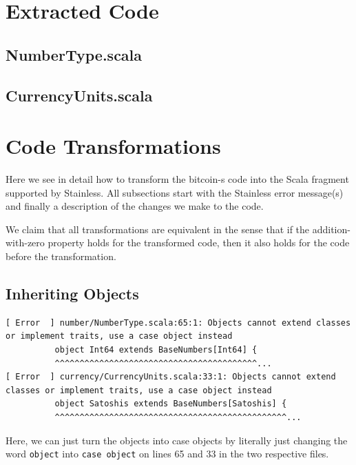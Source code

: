 \documentclass[runningheads]{llncs}
\begin{document}
\section{Extracted Code}
\label{sec:extracted}

\subsection{NumberType.scala}


\subsection{CurrencyUnits.scala}



\section{Code Transformations} 
\label{sec:transform}

Here we see in detail how to transform the bitcoin-s code into the
Scala fragment supported by Stainless. All subsections start with the
Stainless error message(s) and finally a description of the changes we
make to the code.

We claim that all transformations are equivalent in the sense that if
the addition-with-zero property holds for the transformed code, then
it also holds for the code before the transformation.


\subsection{Inheriting Objects}


\begin{lstlisting}[style=stainless]
[ Error  ] number/NumberType.scala:65:1: Objects cannot extend classes or implement traits, use a case object instead
          object Int64 extends BaseNumbers[Int64] {
          ^^^^^^^^^^^^^^^^^^^^^^^^^^^^^^^^^^^^^^^^^...
[ Error  ] currency/CurrencyUnits.scala:33:1: Objects cannot extend classes or implement traits, use a case object instead
          object Satoshis extends BaseNumbers[Satoshis] {
          ^^^^^^^^^^^^^^^^^^^^^^^^^^^^^^^^^^^^^^^^^^^^^^^...
\end{lstlisting}

Here, we can just turn the objects into case objects by literally just
changing the word \texttt{object} into \texttt{case object} on lines
65 and 33 in the two respective files.
\end{document}
